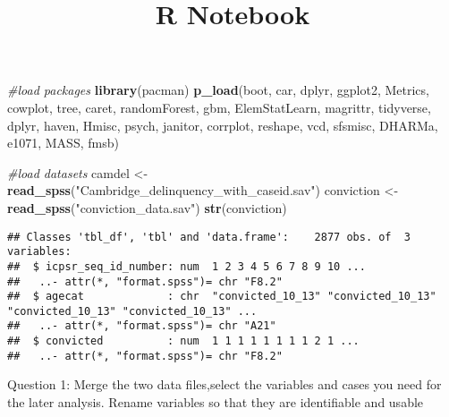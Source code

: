 \documentclass[]{article}
\title{R Notebook}
\author{}
\date{}
\newenvironment{Shaded}{\begin{snugshade}}{\end{snugshade}}
\newcommand{\KeywordTok}[1]{\textcolor[rgb]{0.13,0.29,0.53}{\textbf{#1}}}
\newcommand{\StringTok}[1]{\textcolor[rgb]{0.31,0.60,0.02}{#1}}
\newcommand{\CommentTok}[1]{\textcolor[rgb]{0.56,0.35,0.01}{\textit{#1}}}
\newcommand{\NormalTok}[1]{#1}
\begin{document}
\maketitle

\begin{Shaded}
\begin{Highlighting}[]
\CommentTok{#load packages}
\KeywordTok{library}\NormalTok{(pacman)}
\KeywordTok{p_load}\NormalTok{(boot, car, dplyr, ggplot2, Metrics, cowplot, tree, }
\NormalTok{       caret, randomForest, gbm, ElemStatLearn, magrittr, tidyverse, dplyr, haven, Hmisc, psych, janitor, corrplot, reshape, vcd, sfsmisc, DHARMa, e1071, MASS, fmsb)}
\end{Highlighting}
\end{Shaded}

\begin{Shaded}
\begin{Highlighting}[]
\CommentTok{#load datasets}
\NormalTok{camdel <-}\StringTok{ }\KeywordTok{read_spss}\NormalTok{(}\StringTok{"Cambridge_delinquency_with_caseid.sav"}\NormalTok{)}
\NormalTok{conviction <-}\StringTok{ }\KeywordTok{read_spss}\NormalTok{(}\StringTok{"conviction_data.sav"}\NormalTok{)}
\KeywordTok{str}\NormalTok{(conviction)}
\end{Highlighting}
\end{Shaded}

\begin{verbatim}
## Classes 'tbl_df', 'tbl' and 'data.frame':    2877 obs. of  3 variables:
##  $ icpsr_seq_id_number: num  1 2 3 4 5 6 7 8 9 10 ...
##   ..- attr(*, "format.spss")= chr "F8.2"
##  $ agecat             : chr  "convicted_10_13" "convicted_10_13" "convicted_10_13" "convicted_10_13" ...
##   ..- attr(*, "format.spss")= chr "A21"
##  $ convicted          : num  1 1 1 1 1 1 1 1 2 1 ...
##   ..- attr(*, "format.spss")= chr "F8.2"
\end{verbatim}

Question 1: Merge the two data files,select the variables and cases you
need for the later analysis. Rename variables so that they are
identifiable and usable
\end{document}
